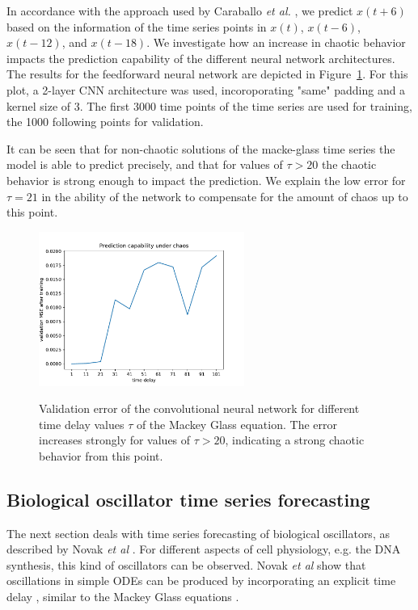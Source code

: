 \documentclass{article}
\begin{document}
In accordance with the approach used by Caraballo \textit{et al.}
\cite{caraballo2016}, we predict $x(t+6)$ based on the information of the time 
series points in $x(t)$, $x(t-6)$, $x(t-12)$, and $x(t-18)$. We investigate how
an increase in chaotic behavior impacts the prediction capability of the
different neural network architectures. The results for the feedforward neural
network are depicted in Figure~\ref{fig:mackey_cnn}. For this plot, a 2-layer 
CNN architecture was used, incoroporating "same" padding and a kernel size of 3.
The first 3000 time points of the time series are used for training, the 1000 
following points for validation.

It can be seen that for non-chaotic solutions of the macke-glass time series the
model is able to predict precisely, and that for values of $\tau > 20$ the 
chaotic behavior is strong enough to impact the prediction. We explain the low
error for $\tau = 21$ in the ability of the network to compensate for the amount
of chaos up to this point.
 
\begin{figure}
  \centering
  \includegraphics[width=0.6\textwidth]{figures/mackey_glass_cnn.pdf}
  \label{fig:mackey_cnn}
  \caption{Validation error of the convolutional neural network for different 
  time delay values $\tau$ of the Mackey Glass equation. The error increases 
  strongly for values of $\tau > 20$, indicating a strong chaotic behavior 
  from this point.}
\end{figure}

\subsection{Biological oscillator time series forecasting}

The next section deals with time series forecasting of biological oscillators, 
as described by Novak \textit{et al} \cite{novak2008}. For different aspects of
cell physiology, e.g. the DNA synthesis, this kind of oscillators can be 
observed. Novak \textit{et al} show that oscillations in simple ODEs can be 
produced by incorporating an explicit time delay \cite{novak2008}, similar to 
the Mackey Glass equations \cite{mackey1977}.
\end{document}
